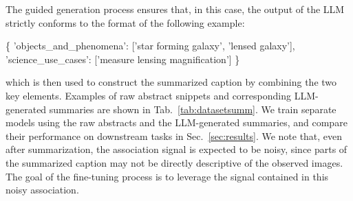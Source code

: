 \documentclass[10pt]{article} %
\newcommand{\SM}[1]{\textcolor{blue}{[SM: #1]}}
\begin{document}
The guided generation process ensures that, in this case, the output of the LLM strictly conforms to the format of the following example:
\begin{center}
  \begin{jsoncode}
    \centering
          \color{black}\{
            \color{codegreen}'objects_and_phenomena'\color{black}: [\color{codegreen}'star forming galaxy', 'lensed galaxy'\color{black}], 
            \color{codegreen}'science_use_cases'\color{black}: [\color{codegreen}'measure lensing magnification'\color{black}]
          \color{black}\}
  \end{jsoncode}
  \end{center}
which is then used to construct the summarized caption by combining the two key elements.
%
Examples of raw abstract snippets and corresponding LLM-generated summaries are shown in Tab.~\ref{tab:datasetsumm}.
%
%
We train separate models using the raw abstracts and the LLM-generated summaries, and compare their performance on downstream tasks in Sec.~\ref{sec:results}.
%
We note that, even after summarization, the association signal is expected to be noisy, since parts of the summarized caption may not be directly descriptive of the observed images. The goal of the fine-tuning process is to leverage the signal contained in this noisy association.

\end{document}
